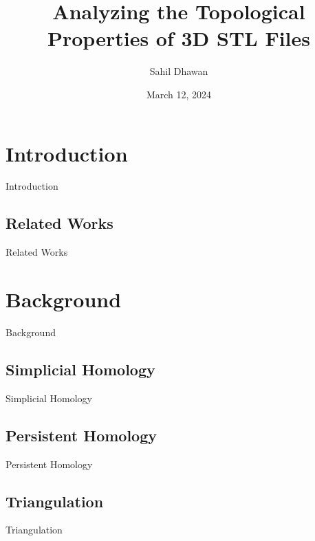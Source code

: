 \documentclass[xcolor=dvipsnames]{beamer}
\author{Sahil Dhawan}
\title[Analyzing Topological Properties of 3D files]{Analyzing the Topological Properties of 3D STL Files}
\institute[UNC Greensboro]{University of North Carolina at Greensboro}
\date{March 12, 2024}
\begin{document}
\begin{frame}
\titlepage
\end{frame}

\begin{frame}
\tableofcontents
\end{frame}

\section{Introduction}
\begin{frame}{Introduction}

\end{frame}

\subsection{Related Works}
\begin{frame}{Related Works}

\end{frame}

\section{Background}
\begin{frame}{Background}

\end{frame}

\subsection{Simplicial Homology}
\begin{frame}{Simplicial Homology}

\end{frame}

\subsection{Persistent Homology}
\begin{frame}{Persistent Homology}

\end{frame}

\subsection{Triangulation}
\begin{frame}{Triangulation}

\end{frame}
\end{document}
